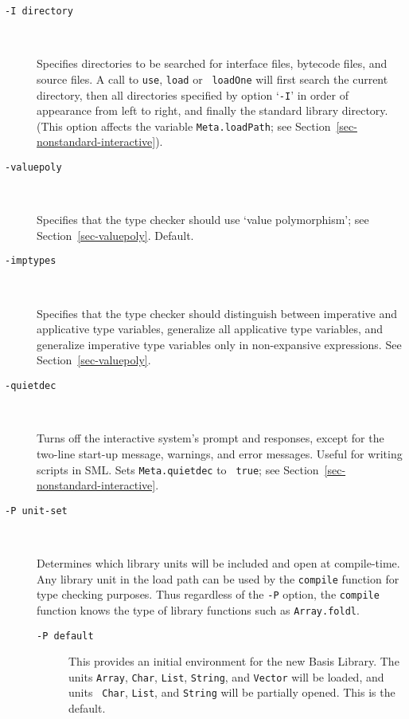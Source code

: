\documentclass[fleqn]{article}
\begin{document}
\begin{description}
\item[{\tt -I {\rm directory}}]\mbox{ }

  Specifies directories to be searched for interface files, bytecode
  files, and source files.  A call to {\tt use}, {\tt load} or {\tt
    loadOne} will first search the current directory, then all
  directories specified by option `{\tt -I}' in order of appearance
  from left to right, and finally the standard library directory.
  (This option affects the variable {\tt Meta.loadPath}; see
  Section~\ref{sec-nonstandard-interactive}).

\item[{\tt -valuepoly}]\mbox{ }

  Specifies that the type checker should use `value polymorphism'; see
  Section~\ref{sec-valuepoly}.  Default.

\item[{\tt -imptypes}]\mbox{ }

  Specifies that the type checker should distinguish between
  imperative and applicative type variables, generalize all
  applicative type variables, and generalize imperative type variables
  only in non-expansive expressions.  See Section~\ref{sec-valuepoly}.

\item[{\tt -quietdec}]\mbox{ }

  Turns off the interactive system's prompt and responses, except for
  the two-line start-up message, warnings, and error messages.  Useful
  for writing scripts in SML\@.  Sets {\tt Meta.quietdec} to {\tt
    true}; see Section~\ref{sec-nonstandard-interactive}.

\item[{\tt -P {\rm unit-set}}]\mbox{ }

  Determines which library units will be included and open at
  compile-time.  Any library unit in the load path can be used by the
  {\tt compile} function for type checking purposes.  Thus regardless
  of the {\tt -P} option, the {\tt compile} function knows the type of
  library functions such as {\tt Array.foldl}.

  \begin{description}
  \item[{\tt -P default}] This provides an initial environment for the
    new Basis Library.  The units {\tt Array}, {\tt Char}, {\tt List},
    {\tt String}, and {\tt Vector} will be loaded, and units {\tt
      Char}, {\tt List}, and {\tt String} will be partially opened.
    This is the default.


\end{description}
\end{description}
\end{document}
